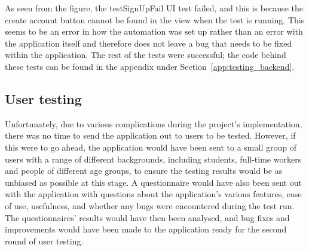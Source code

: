     
    
    As seen from the figure, the testSignUpFail UI test failed, and this is because the create account button cannot be found in the view when the test is running.  This seems to be an error in how the automation was set up rather than an error with the application itself and therefore does not leave a bug that needs to be fixed within the application.  The rest of the tests were successful; the code behind these tests can be found in the appendix under Section~\ref{app:testing_backend}.
    
    \subsection{User testing}
    Unfortunately, due to various complications during the project's implementation, there was no time to send the application out to users to be tested.  However, if this were to go ahead, the application would have been sent to a small group of users with a range of different backgrounds, including students, full-time workers and people of different age groups, to ensure the testing results would be as unbiased as possible at this stage.  A questionnaire would have also been sent out with the application with questions about the application's various features, ease of use, usefulness, and whether any bugs were encountered during the test run.  The questionnaires' results would have then been analysed, and bug fixes and improvements would have been made to the application ready for the second round of user testing.